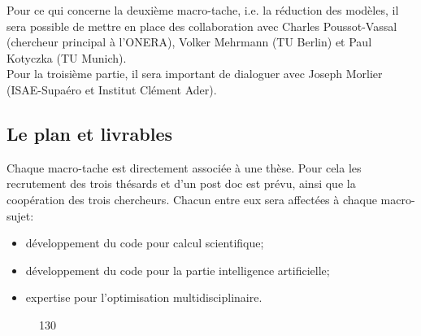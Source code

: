 \documentclass[french]{article}
\begin{document}
Pour ce qui concerne la deuxième macro-tache, i.e. la réduction des modèles, il sera possible de mettre en place des collaboration avec Charles Poussot-Vassal (chercheur principal \`a l'ONERA),  Volker Mehrmann (TU Berlin) et Paul Kotyczka (TU Munich). \\
 
Pour la troisième partie, il sera important de dialoguer avec Joseph Morlier (ISAE-Supa\'ero et Institut Clément Ader).
 

\subsection{Le plan et livrables}

Chaque macro-tache est directement associ\'ee \`a une thèse. Pour cela les recrutement des trois thésards et d'un post doc est prévu, ainsi que la coopération des trois chercheurs. Chacun entre eux sera affect\'ees \`a chaque macro-sujet:
\begin{itemize}
\item développement du code pour calcul scientifique;
\item développement du code pour la partie intelligence artificielle;
\item expertise pour l'optimisation multidisciplinaire.
\end{itemize} 
\begin{figure}[h]
	\begin{center}
	\begin{ganttchart}[y unit title=0.6cm,
		y unit chart=0.6cm, 
		x unit=0.4cm,
		vgrid,hgrid, 
		title label anchor/.style={below=-1.6ex},
		title left shift=.05,
		title right shift=-.05,
		title height=1,
		progress label text={},
		bar height=0.7,
		group right shift=0,
		group top shift=.6,
		group height=.4]{1}{30}
		 \\
		 \\
		 \\
		 \\
		 \\
		 \\
		 \\
		 \\
		 \\
	\end{ganttchart}
	\end{center}		
\end{figure}
\end{document}
